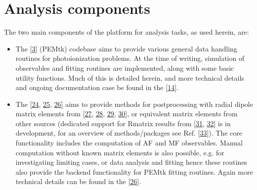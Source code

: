 \documentclass[letterpaper,table,10pt,english]{jupyterBook}
\begin{document}
\section{Analysis components}
\label{\detokenize{part1/platform_intro_070723:analysis-components}}\label{\detokenize{part1/platform_intro_070723:sect-platform-analysis}}
\sphinxAtStartPar
The two main components of the platform for analysis tasks, as used herein, are:
\begin{itemize}
\item {} 
\sphinxAtStartPar
The  {[}\hyperlink{cite.backmatter/bibliography:id668}{3}{]} (PEMtk) codebase aims to provide various general data handling routines for photoionization problems. At the time of writing, simulation of observables and fitting routines are implemented, along with some basic utility functions.
Much of this is detailed herein, and more technical details and ongoing documentation case be found in the  {[}\hyperlink{cite.backmatter/bibliography:id667}{14}{]}.

\item {} 
\sphinxAtStartPar
The  {[}\hyperlink{cite.backmatter/bibliography:id655}{24}, \hyperlink{cite.backmatter/bibliography:id597}{25}, \hyperlink{cite.backmatter/bibliography:id595}{26}{]} aims to provide methods for post\sphinxhyphen{}processing with  radial dipole matrix
elements from  {[}\hyperlink{cite.backmatter/bibliography:id747}{27}, \hyperlink{cite.backmatter/bibliography:id617}{28}, \hyperlink{cite.backmatter/bibliography:id786}{29}, \hyperlink{cite.backmatter/bibliography:id750}{30}{]}, or equivalent matrix elements from other sources (dedicated support for R\sphinxhyphen{}matrix results from  {[}\hyperlink{cite.backmatter/bibliography:id535}{31}, \hyperlink{cite.backmatter/bibliography:id838}{32}{]} is in development, for an overview of  methods/packages see Ref. {[}\hyperlink{cite.backmatter/bibliography:id584}{33}{]}).
The core functionality includes the computation of AF and MF observables. Manual computation without known matrix elements is also possible, e.g. for investigating
limiting cases, or data analysis and fitting \sphinxhyphen{} hence these routines also provide the backend functionality for PEMtk fitting routines. Again more technical details can be found in the  {[}\hyperlink{cite.backmatter/bibliography:id595}{26}{]}.

\end{itemize}
\end{document}
